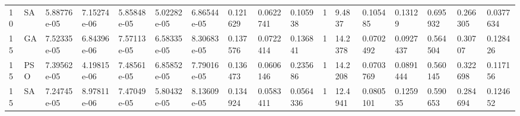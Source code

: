 \begin{tabular}{lllllllllllllllll}
10 & SA & 5.88776e-05 & 7.15274e-06 & 5.85848e-05 & 5.02282e-05 & 6.86544e-05 & 0.121629 & 0.0622741 & 0.105938 & 1 & 9.4837 & 0.105485 & 0.13129 & 0.695932 & 0.266305 & 0.0377634 \\
15 & GA & 7.52335e-05 & 6.84396e-06 & 7.57113e-05 & 6.58335e-05 & 8.30683e-05 & 0.137576 & 0.0722414 & 0.136841 & 1 & 14.2378 & 0.0702492 & 0.0927437 & 0.564504 & 0.30707 & 0.128426 \\
15 & PSO & 7.39562e-05 & 4.19815e-06 & 7.48561e-05 & 6.85852e-05 & 7.79016e-05 & 0.136473 & 0.0606146 & 0.235686 & 1 & 14.2208 & 0.0703769 & 0.0891444 & 0.560145 & 0.322698 & 0.117156 \\
15 & SA & 7.24745e-05 & 8.97811e-06 & 7.47049e-05 & 5.80432e-05 & 8.13609e-05 & 0.134924 & 0.0583411 & 0.0564336 & 1 & 12.4941 & 0.0805101 & 0.125935 & 0.590653 & 0.284694 & 0.124652 \\
\bottomrule
\end{tabular}
